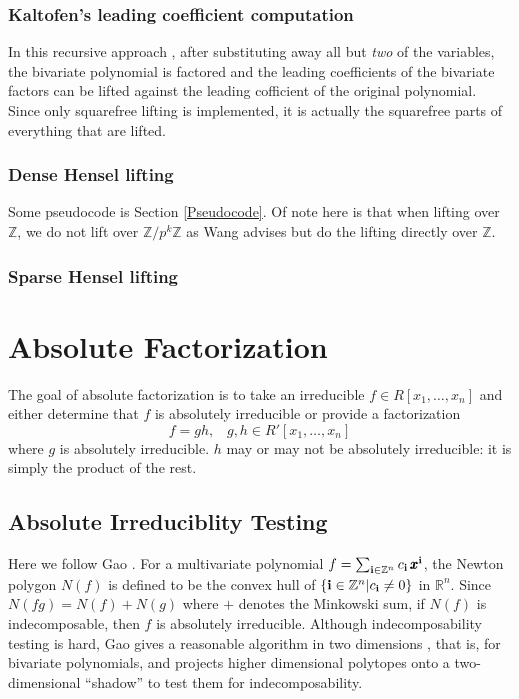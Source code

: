 \documentclass[11pt,reqno]{amsart}
\numberwithin{equation}{section}
\begin{document}
\subsubsection{Kaltofen's leading coefficient computation}
In this recursive approach \cite{KALTOFEN}, after substituting away all but
\emph{two} of the variables, the bivariate polynomial is factored and the
leading coefficients of the bivariate factors can be lifted against the leading
cofficient of the original polynomial. Since only squarefree lifting is
implemented, it is actually the squarefree parts of everything that are lifted.

\subsubsection{Dense Hensel lifting}
Some pseudocode is Section \ref{Pseudocode}. Of note here is
that when lifting over $\mathbb{Z}$, we do not lift over
$\mathbb{Z}/p^k\mathbb{Z}$ as Wang \cite{WANG} advises but do the lifting
directly over $\mathbb{Z}$.

\subsubsection{Sparse Hensel lifting}


\section{Absolute Factorization}

The goal of absolute factorization is to take an irreducible
$f \in R[x_1, \dots, x_n]$ and either determine that $f$ is absolutely
irreducible or provide a factorization
\begin{equation*}
f = g h \text{,} \quad g, h \in R'[x_1, \dots, x_n]
\end{equation*}
where $g$ is absolutely irreducible. $h$ may or may not be absolutely
irreducible: it is simply the product of the rest.

\subsection{Absolute Irreduciblity Testing}
Here we follow Gao \cite{GAO}. For a multivariate polynomial
$f = \sum_{\bold{i} \in \mathbb{Z}^n}{c_{\bold{i}} \, \pmb{x}^{\bold{i}}}$, the
Newton polygon $N(f)$ is defined to be the convex hull of
$\{\bold{i} \in \mathbb{Z}^n | c_{\bold{i}} \ne 0\}$ in $\mathbb{R}^n$.
Since $N(fg) = N(f) + N(g)$ where $+$ denotes the Minkowski sum, if $N(f)$ is
indecomposable, then $f$ is absolutely irreducible. Although indecomposability 
testing is hard, Gao gives a reasonable algorithm in two dimensions
\cite{GAO2}, that is, for bivariate polynomials, and projects higher
dimensional polytopes onto a two-dimensional ``shadow'' to test them for
indecomposability.
\end{document}
